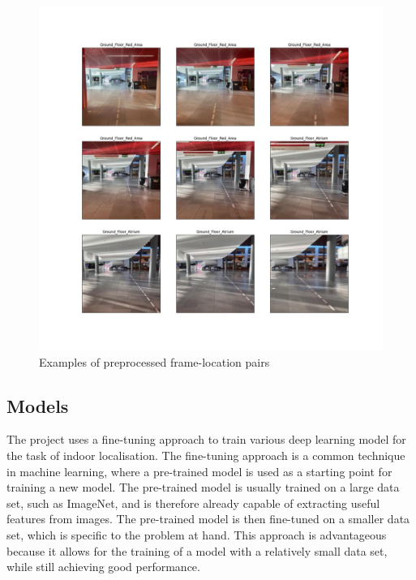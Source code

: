 \documentclass{article}
\begin{document}
  \begin{figure}[ht]
    \centering
    \includegraphics[width=\linewidth]{figures/preprocessed-data.jpg}
    \caption{Examples of preprocessed frame-location pairs}
    \label{fig:preprocessed-data}
  \end{figure}
  

  \subsection{Models} %
  \label{sub:models}

  The project uses a fine-tuning approach to train various deep learning model for
  the task of indoor localisation. The fine-tuning approach is a common
  technique in machine learning, where a pre-trained model is used as a starting
  point for training a new model. The pre-trained model is usually trained on a
  large data set, such as ImageNet, and is therefore
  already capable of extracting useful features from images. The pre-trained
  model is then fine-tuned on a smaller data set, which is specific to the
  problem at hand. This approach is advantageous because it allows for the
  training of a model with a relatively small data set, while still achieving
  good performance.
\end{document}
